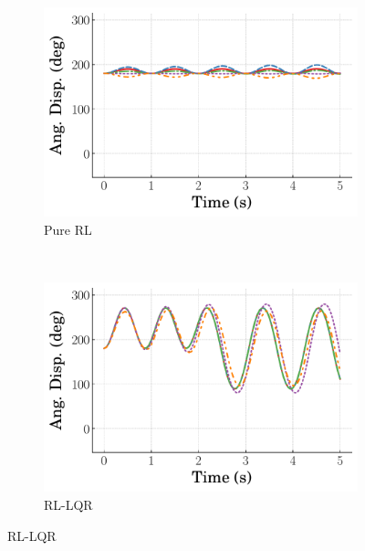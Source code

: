 %
\begin{figure}[tb]
    \centering
    \begin{subfigure}[b]{0.49\textwidth}
        \centering
        \includegraphics[width=\textwidth]{figures/figures_RL_model_based_control/time_responses_invpend/invpend_pure_RL/Angular_displacement_180_init_0_steps.pdf}
        \caption{Pure RL}
        \label{subfig_chap2:invpend_resp_0steps_pure_RL}
    \end{subfigure}\\
    \hfill
    \begin{subfigure}[b]{0.49\textwidth}
        \centering
        \includegraphics[width=\textwidth]{figures/figures_RL_model_based_control/time_responses_invpend/invpend_RL_LQR/Angular_displacement_180_init_0_steps.pdf}
        \caption{RL-LQR}
        \label{subfig_chap2:invpend_resp_0steps_RL_LQR}
    \end{subfigure}

\end{figure}
